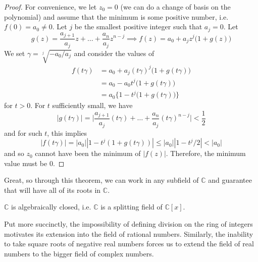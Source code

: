 \begin{proof}
    For convenience, we let $z_0 = 0$ (we can do a change of basis on the polynomial) and assume that the minimum is some positive number, i.e. $f(0) = a_0 \neq 0$. Let $j$ be the smallest positive integer such that $a_j = 0$. Let 
    \begin{equation}
      g(z) = \frac{a_{j+1}}{a_j} z + \ldots + \frac{a_n}{a_j} z^{n-j} \implies f(z) = a_0 + a_j z^j \big( 1 + g(z) \big) 
    \end{equation}
    We set $\gamma = \sqrt[j]{-a_0/a_j}$ and consider the values of 
    \begin{align}
      f(t \gamma) & = a_0 + a_j (t\gamma)^j \big( 1 + g(t\gamma) \big) \\
                  & = a_0 - a_0 t^j \big(1 + g(t \gamma) \big) \\
                  & = a_0 \big\{ 1 - t^j \big(1 + g(t \gamma) \big) \big\}
    \end{align} 
    for $t > 0$. For $t$ sufficiently small, we have 
    \begin{equation}
      |g(t \gamma)| = \bigg| \frac{a_{j+1}}{a_j} (t \gamma) + \ldots + \frac{a_n}{a_j} (t \gamma)^{n-j} \bigg| < \frac{1}{2} 
    \end{equation}
    and for such $t$, this implies 
    \begin{equation}
      |f(t \gamma)| = |a_0| |1 - t^j (1 + g(t \gamma))| \leq |a_0| |1 - t^j/2| < |a_0|
    \end{equation}
    and so $z_0$ cannot have been the minimum of $|f(z)|$. Therefore, the minimum value must be $0$.  
  \end{proof}

  Great, so through this theorem, we can work in any subfield of $\mathbb{C}$ and guarantee that will have all of its roots in $\mathbb{C}$. 

  \begin{corollary}
    $\mathbb{C}$ is algebraically closed, i.e. $\mathbb{C}$ is a splitting field of $\mathbb{C}[x]$. 
  \end{corollary}

  Put more succinctly, the impossibility of defining division on the ring of integers motivates its extension into the field of rational numbers. Similarly, the inability to take square roots of negative real numbers forces us to extend the field of real numbers to the bigger field of complex numbers. 

